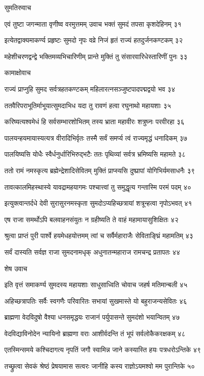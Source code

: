 सुमतिरुवाच

एवं तुष्टा जगन्माता वृणीष्व वरमुत्तमम्
उवाच भक्तं सुमदं तपसा कृशदेहिनम् ३१

इत्येतद्वाक्यमाकर्ण्य प्रहृष्टः सुमदो नृपः
वव्रे निजं हृतं राज्यं हतदुर्जनकण्टकम् ३२

महेशीचरणद्वन्द्वे भक्तिमव्यभिचारिणीम्
प्रान्ते मुक्तिं तु संसारवारिधेस्तारिणीं पुनः ३३

कामाक्षोवाच

राज्यं प्राप्नुहि सुमद सर्वत्रहतकण्टकम्
महिलारत्नसञ्जुष्टपादपद्मद्वयो भव ३४

ततवैरिपराभूतिर्माभूयात्सुमदाभिध
यदा तु रावणं हत्वा रघुनाथो महायशाः ३५

करिष्यत्यश्वमेधं हि सर्वसम्भारशोभितम्
तस्य भ्राता महावीरः शत्रुघ्नः परवीरहा ३६

पालयन्हयमायास्यत्यत्र वीरादिभिर्वृतः
तस्मै सर्वं समर्प्य त्वं राज्यमृद्धं धनादिकम् ३७

पालयिष्यसि योधैः स्वैर्धनुर्धारिभिरुद्भटैः
ततः पृथिव्यां सर्वत्र भ्रमिष्यसि महामते ३८

ततो रामं नमस्कृत्य ब्रह्मेन्द्रेशादिसेवितम्
मुक्तिं प्राप्स्यसि दुष्प्रापां योगिभिर्यमसाधनैः ३९

तावत्कालमिहस्थास्ये यावद्रामहयागमः
पश्चात्त्वां तु समुद्धृत्य गन्तास्मि परमं पदम् ४०

इत्युक्त्वान्तर्दधे देवी सुरासुरनमस्कृता
सुमदोऽप्यहिच्छत्रायां शत्रून्हत्वा नृपोऽभवत् ४१

एष राजा समर्थोऽपि बलवाहनसंयुतः
न ग्रहीष्यति ते वाहं महामायासुशिक्षितः ४२

श्रुत्वा प्राप्तं पुरी पार्श्वे हयमेधहयोत्तमम्
त्वां च सर्वैर्महाराजैः सेविताङ्घ्रिं महामतिम् ४३

सर्वं दास्यति सर्वज्ञ राजा सुमदनामधृक्
अधुनातन्महाराज रामचन्द्र प्रतापतः ४४

शेष उवाच

इति वृत्तं समाकर्ण्य सुमदस्य महायशाः
साधुसाध्विति चोवाच जहर्ष मतिमान्बली ४५

अहिच्छत्रापतिः सर्वैः स्वगणैः परिवारितः
सभायां सुखमास्ते यो बहुराजन्यसेवितः ४६

ब्राह्मणा वेदविदुषो वैश्या धनसमृद्धयः
राजानं पर्युपासन्ते सुमदंशो भयान्वितम् ४७

वेदविद्याविनोदेन न्यायिनो ब्राह्मणा वराः
आशीर्वदन्ति तं भूपं सर्वलोकैकरक्षकम् ४८

एतस्मिन्समये कश्चिदागत्य नृपतिं जगौ
स्वामिन्न जाने कस्यास्ति हयः पत्रधरोऽन्तिके ४९

तच्छ्रुत्वा सेवकं श्रेष्ठं प्रेषयामास सत्वरः
जानीहि कस्य राज्ञोऽयमश्वो मम पुरान्तिके ५०

